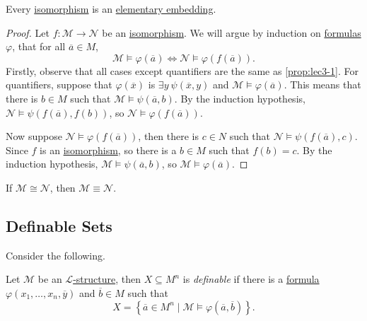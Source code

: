 \begin{proposition}\label{prop:isomorphism-is-elementary-embedding}
	Every \hyperref[def:isomorphism]{isomorphism} is an \hyperref[def:elementary-embedding]{elementary embedding}.
\end{proposition}
\begin{proof}
	Let \(f\colon \mathcal{M} \to  \mathcal{N} \) be an \hyperref[def:isomorphism]{isomorphism}. We will argue by induction on \hyperref[def:formula]{formulas} \(\varphi \), that for all \(\overline{a} \in M\),
	\[
		\mathcal{M} \models \varphi (\overline{a} ) \iff \mathcal{N} \models \varphi (f(\overline{a} )).
	\]
	Firstly, observe that all cases except quantifiers are the same as \autoref{prop:lec3-1}. For quantifiers, suppose that \(\varphi (\overline{x} )\) is \(\exists y\ \psi (\overline{x} , y)\) and \(\mathcal{M} \models \varphi (\overline{a} )\). This means that there is \(b\in M\) such that \(\mathcal{M} \models \psi (\overline{a} , b)\). By the induction hypothesis, \(\mathcal{N} \models \psi (f(\overline{a}) , f(b))\), so \(\mathcal{N} \models \varphi (f(\overline{a} ))\).

	Now suppose \(\mathcal{N} \models \varphi (f(\overline{a} ))\), then there is \(c\in N\) such that \(\mathcal{N} \models \psi (f(\overline{a} ), c)\). Since \(f\) is an \hyperref[def:isomorphism]{isomorphism}, so there is a \(b\in M\) such that \(f(b) = c\). By the induction hypothesis, \(\mathcal{M} \models \psi (\overline{a} , b)\), so \(\mathcal{M} \models \varphi (\overline{a} )\).
\end{proof}

\begin{corollary}
	If \(\mathcal{M} \cong \mathcal{N} \), then \(\mathcal{M} \equiv \mathcal{N} \).
\end{corollary}

\subsection{Definable Sets}
Consider the following.

\begin{definition}[Definable]\label{def:definable}
	Let \(\mathcal{M} \) be an \hyperref[def:structure]{\(\mathcal{L} \)-structure}, then \(X \subseteq M^n\) is \emph{definable} if there is a \hyperref[def:formula]{formula} \(\varphi (x_1, \ldots , x_n, \overline{y} )\) and \(\overline{b} \in M\) such that
	\[
		X = \left\{ \overline{a} \in M^n \mid \mathcal{M} \models \varphi (\overline{a} , \overline{b} ) \right\}.
	\]
\end{definition}

